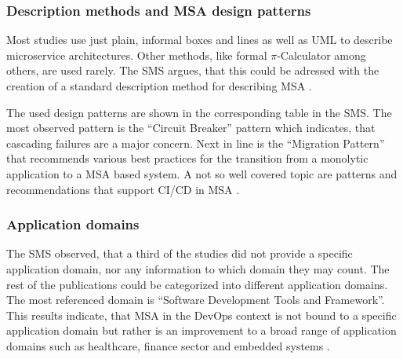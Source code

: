 \subsubsection{Description methods and MSA design patterns}

Most studies use just plain, informal boxes and lines as well as UML to
describe microservice architectures. Other methods, like formal $\pi$-Calculator
among others, are used rarely. The SMS argues, that this could be adressed with
the creation of a standard description method for describing MSA
\cite{waseem:SMSMSADevOps}.

The used design patterns are shown in the corresponding table in the SMS.
The most observed pattern is the ``Circuit Breaker'' \cite{montesi:CircuitBreakers} pattern which indicates,
that cascading failures are a major concern. Next in line is the ``Migration
Pattern'' \cite{waseem:SMSMSADevOps} that recommends various best practices for the transition from
a monolytic application to a MSA based system.
A not so well covered topic are patterns and recommendations
that support CI/CD in MSA \cite{waseem:SMSMSADevOps}.

\subsubsection{Application domains}

The SMS observed, that a third of the studies did not provide a specific application
domain, nor any information to which domain they may count. The rest of the publications
could be categorized into different application domains. The most referenced domain
is ``Software Development Tools and Framework''. This results indicate, that MSA
in the DevOps context is not bound to a specific application domain but rather is
an improvement to a broad range of application domains such as healthcare, finance sector
and embedded systems \cite{waseem:SMSMSADevOps}.
